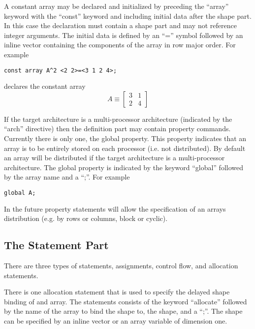 A constant array may be declared and initialized by preceding the ``array''
keyword with the ``const'' keyword and including initial data after the
shape part.  In this case the declaration must contain a shape part and
may not reference integer arguments.  The initial data is defined by
an ``='' symbol followed by an inline vector containing the components
of the array in row major order.  For example
\begin{verbatim}
const array A^2 <2 2>=<3 1 2 4>;
\end{verbatim}
declares the constant array
$$A\equiv\left[ \begin{array}{ll}
3 & 1 \\
2 & 4
\end{array} \right]$$

If the target architecture is a multi-processor architecture (indicated by
the ``arch'' directive) then the definition part may contain property
commands.  Currently there is only one, the global property.  This property
indicates that an array is to be entirely stored on each processor (i.e. not
distributed).  By default an array will be distributed if the target 
architecture is a multi-processor architecture.  The global property is
indicated by the keyword ``global'' followed by the array name and a ``;''.
For example
\begin{verbatim}
global A;
\end{verbatim}
In the future property
statements will allow the specification of an arrays distribution (e.g. by
rows or columns, block or cyclic).

\subsection{The Statement Part}

There are three types of statements, assignments, control flow, and allocation
statements.

There is one allocation statement that is used to specify the delayed shape 
binding of and array.  The statements consists of the keyword ``allocate''
followed by the name of the array to bind the shape to, the shape, and
a ``;''.  The shape can be specified by an inline vector or an array variable
of dimension one.

